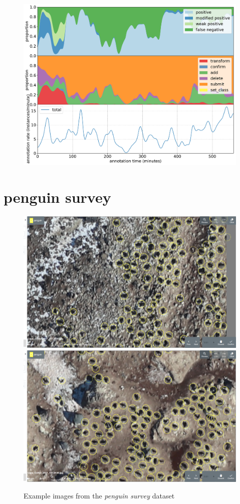 \begin{figure}[!h]
\centering
\includegraphics[width=1.0\linewidth]{charts/action_annotations/scallops.pdf}
\caption{  }
\label{fig:scallop_annotation}
\end{figure}

\pagebreak
\section {penguin survey}
\label{sec:penguin_survey_details}


\begin{figure}[!h]
\centering
  \includegraphics[width=0.475\linewidth]{figures/annotation/screenshots/penguins_aerial.png}
  \hfill
  \includegraphics[width=0.475\linewidth]{figures/annotation/screenshots/penguins_aerial2.png}
  \caption{}
\caption{ Example images from the \emph{penguin survey} dataset}
\label {fig:penguin_aerial_examples}
\end{figure}

